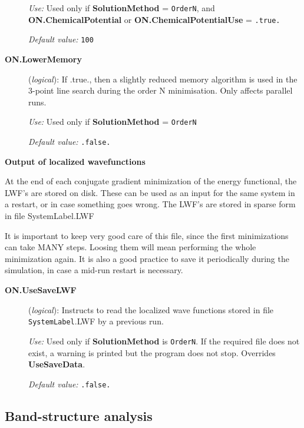 \documentclass[11pt]{article}
\begin{document}
\begin{description}
{\it Use:} Used only if {\bf SolutionMethod} = {\tt OrderN},
and {\bf ON.ChemicalPotential} or  {\bf ON.ChemicalPotentialUse} =
{\tt .true.}

{\it Default value:} {\tt 100}

\item[{\bf ON.LowerMemory}] ({\it logical}):
If .true., then a slightly reduced memory algorithm is used in the
3-point line search during the order N minimisation. Only affects
parallel runs.

{\it Use:} Used only if  {\bf SolutionMethod} = {\tt OrderN}

{\it Default value:} {\tt .false.}


\end{description}

{\bf Output of localized wavefunctions}

At the end of each conjugate gradient minimization of the energy
functional, the LWF's are stored on disk. These can be used as an
input for the same system in a restart, or in case something goes
wrong.  The LWF's are stored in sparse form in file SystemLabel.LWF

It is important to keep very good care of this file, since the first
minimizations can take MANY steps. Loosing them will mean performing
the whole minimization again. It is also a good practice to save it
periodically during the simulation, in case a mid-run restart is
necessary.

\begin{description}

\item[{\bf ON.UseSaveLWF}] ({\it logical}):
Instructs to read the localized wave functions stored in file
{\tt SystemLabel}.LWF by a previous run.

{\it Use:} Used only if {\bf SolutionMethod} is {\tt OrderN}.
If the required file does not exist, a warning is
printed but the program does not stop. Overrides {\bf UseSaveData}.

{\it Default value:} {\tt .false.}

\end{description}

\subsection{Band-structure analysis}
\label{sec:band-structure}
\end{document}

